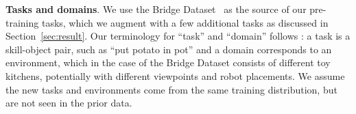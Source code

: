 
\textbf{Tasks and domains}. We use the Bridge Dataset~\cite{ebert2021bridge} as the source of our pre-training tasks, which we augment with a few additional tasks as discussed in Section~\ref{sec:result}. Our terminology for ``task'' and ``domain'' follows \citet{ebert2021bridge}: a task is a skill-object pair, such as ``put potato in pot'' and a domain corresponds to an environment, which in the case of the Bridge Dataset consists of different toy kitchens, potentially with different viewpoints and robot placements. We assume the new tasks and environments come from the same training distribution, but are not seen in the prior data.